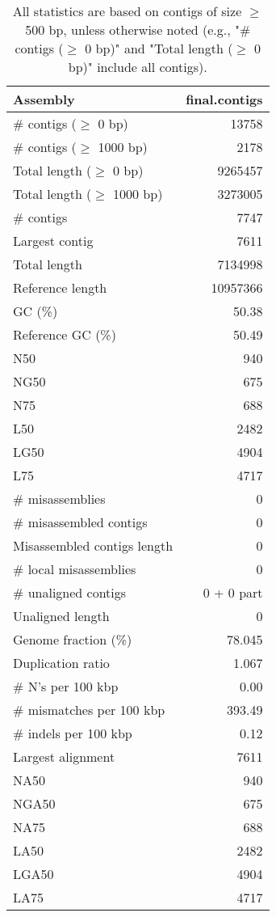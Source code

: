 \documentclass[12pt,a4paper]{article}
\begin{document}
\begin{table}[ht]
\begin{center}
\caption{All statistics are based on contigs of size $\geq$ 500 bp, unless otherwise noted (e.g., "\# contigs ($\geq$ 0 bp)" and "Total length ($\geq$ 0 bp)" include all contigs).}
\begin{tabular}{|l*{1}{|r}|}
\hline
Assembly & final.contigs \\ \hline
\# contigs ($\geq$ 0 bp) & 13758 \\ \hline
\# contigs ($\geq$ 1000 bp) & 2178 \\ \hline
Total length ($\geq$ 0 bp) & 9265457 \\ \hline
Total length ($\geq$ 1000 bp) & 3273005 \\ \hline
\# contigs & 7747 \\ \hline
Largest contig & 7611 \\ \hline
Total length & 7134998 \\ \hline
Reference length & 10957366 \\ \hline
GC (\%) & 50.38 \\ \hline
Reference GC (\%) & 50.49 \\ \hline
N50 & 940 \\ \hline
NG50 & 675 \\ \hline
N75 & 688 \\ \hline
L50 & 2482 \\ \hline
LG50 & 4904 \\ \hline
L75 & 4717 \\ \hline
\# misassemblies & 0 \\ \hline
\# misassembled contigs & 0 \\ \hline
Misassembled contigs length & 0 \\ \hline
\# local misassemblies & 0 \\ \hline
\# unaligned contigs & 0 + 0 part \\ \hline
Unaligned length & 0 \\ \hline
Genome fraction (\%) & 78.045 \\ \hline
Duplication ratio & 1.067 \\ \hline
\# N's per 100 kbp & 0.00 \\ \hline
\# mismatches per 100 kbp & 393.49 \\ \hline
\# indels per 100 kbp & 0.12 \\ \hline
Largest alignment & 7611 \\ \hline
NA50 & 940 \\ \hline
NGA50 & 675 \\ \hline
NA75 & 688 \\ \hline
LA50 & 2482 \\ \hline
LGA50 & 4904 \\ \hline
LA75 & 4717 \\ \hline
\end{tabular}
\end{center}
\end{table}
\end{document}
